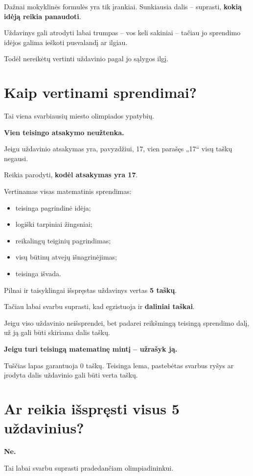 \documentclass[11pt,a4paper]{article}
\newcommand{\calloutbox}[1]{%
  \begin{center}
  \colorbox{callout}{%
    \parbox{0.94\textwidth}{\centering\bfseries #1}%
  }
  \end{center}
}
\begin{document}
Dažnai mokyklinės formulės yra tik įrankiai. Sunkiausia dalis -- suprasti, \textbf{kokią idėją reikia panaudoti}.

Uždavinys gali atrodyti labai trumpas -- vos keli sakiniai -- tačiau jo sprendimo idėjos galima ieškoti pusvalandį ar ilgiau.

Todėl nereikėtų vertinti uždavinio pagal jo sąlygos ilgį.

\section{Kaip vertinami sprendimai?}

Tai viena svarbiausių miesto olimpiados ypatybių.

\textbf{Vien teisingo atsakymo neužtenka.}

Jeigu uždavinio atsakymas yra, pavyzdžiui, 17, vien parašęs „17“ visų taškų negausi.

Reikia parodyti, \textbf{kodėl atsakymas yra 17}.

Vertinamas visas matematinis sprendimas:
\begin{itemize}
  \item teisinga pagrindinė idėja;
  \item logiški tarpiniai žingsniai;
  \item reikalingų teiginių pagrindimas;
  \item visų būtinų atvejų išnagrinėjimas;
  \item teisinga išvada.
\end{itemize}

Pilnai ir taisyklingai išspręstas uždavinys vertas \textbf{5 taškų}.

Tačiau labai svarbu suprasti, kad egzistuoja ir \textbf{daliniai taškai}.

Jeigu viso uždavinio neišsprendei, bet padarei reikšmingą teisingą sprendimo dalį, už ją gali būti skiriama dalis taškų.

\calloutbox{Jeigu turi teisingą matematinę mintį -- užrašyk ją.}

Tuščias lapas garantuoja 0 taškų. Teisinga lema, pastebėtas svarbus ryšys ar įrodyta dalis uždavinio gali būti verta taškų.

\section{Ar reikia išspręsti visus 5 uždavinius?}

\textbf{Ne.}

Tai labai svarbu suprasti pradedančiam olimpiadininkui.
\end{document}

